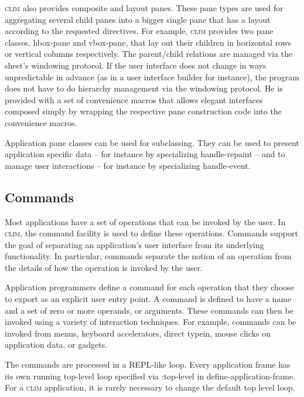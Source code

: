\documentclass[twocolumn,a4paper]{article}
\newcommand {\code}[1]{{\sffamily #1}}
\newcommand {\CLIM}{\textsc{clim}}
\let\class\code
\let\method\code
\let\keyword\code
\begin{document}
\CLIM{} also provides composite and layout panes. These pane types are
used for aggregating several child panes into a bigger single pane
that has a layout according to the requested directives.  For example,
\CLIM{} provides two pane classes, \class{hbox-pane} and
\class{vbox-pane}, that lay out their children in horizontal rows or
vertical columns respectively. The parent/child relations are managed
via the sheet's windowing protocol. If the user interface does not
change in ways unpredictable in advance (as in a user interface
builder for instance), the program does not have to do hierarchy
management via the windowing protocol. He is provided with a set of
convenience macros that allows elegant interfaces composed simply by
wrapping the respective pane construction code into the convenience
macros. %

Application pane classes can be used for subclassing. They can be used
to present application specific data -- for instance by specializing
\method{handle-repaint} -- and to manage user interactions -- for
instance by specializing \method{handle-event}.

\subsection{Commands}

Most applications have a set of operations that can be invoked by the
user. In \CLIM{}, the command facility is used to define these
operations. Commands support the goal of separating an application's
user interface from its underlying functionality.  In particular,
commands separate the notion of an operation from the details of how
the operation is invoked by the user.

Application programmers define a command for each operation that they
choose to export as an explicit user entry point. A command is defined
to have a name and a set of zero or more operands, or arguments. These
commands can then be invoked using a variety of interaction
techniques. For example, commands can be invoked from menus, keyboard
accelerators, direct typein, mouse clicks on application data, or
gadgets.

The commands are processed in a REPL-like loop. Every application
frame has its own running top-level loop specified via
\keyword{:top-level} in \method{define-application-frame}. For a
\CLIM{} application, it is rarely necessary to change the default top
level loop.
\end{document}
